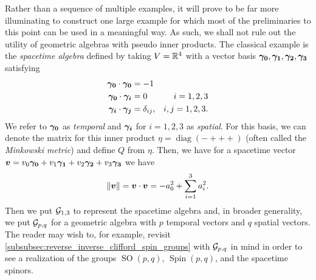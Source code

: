 Rather than a sequence of multiple examples, it will prove to be far more illuminating to construct one large example for which most of the preliminaries to this point can be used in a meaningful way. As such, we shall not rule out the utility of geometric algebras with pseudo inner products. The classical example is the \emph{spacetime algebra} defined by taking $V=\mathbb{R}^4$ with a vector basis $\boldsymbol{\gamma_0},\boldsymbol{\gamma_1},\boldsymbol{\gamma_2},\boldsymbol{\gamma_3}$ satisfying
\begin{subequations}
\begin{align}
\boldsymbol{\gamma_0} \cdot \boldsymbol{\gamma_0} &= -1\\
\boldsymbol{\gamma_0} \cdot \boldsymbol{\gamma_i} &= 0  &i=1,2,3\\
\boldsymbol{\gamma_i} \cdot \boldsymbol{\gamma_j} &= \delta_{ij}, &i,j=1,2,3.
\end{align}
\end{subequations}
We refer to $\boldsymbol{\gamma_0}$ as \emph{temporal} and $\boldsymbol{\gamma_i}$ for $i=1,2,3$ as \emph{spatial}. For this basis, we can denote the matrix for this inner product $\eta =\operatorname{diag}(-+++)$ (often called the \emph{Minkowski metric}) and define $Q$ from $\eta$. Then, we have for a spacetime vector $\boldsymbol{v} = v_0 \boldsymbol{\gamma_0} +v_1 \boldsymbol{\gamma_1} + v_2 \boldsymbol{\gamma_2} + v_3 \boldsymbol{\gamma_3}$ we have
\begin{equation}
\label{eq:spacetime_inner_product}
\|\boldsymbol{v}\| = \boldsymbol{v} \cdot \boldsymbol{v} = -a_0^2 + \sum_{i=1}^3 a_i^2.
\end{equation}
Then we put $\mathcal{G}_{1,3}$ to represent the spacetime algebra and, in broader generality, we put $\mathcal{G}_{p,q}$ for a geometric algebra with $p$ temporal vectors and $q$ spatial vectors. The reader may wish to, for example, revisit \cref{subsubsec:reverse_inverse_clifford_spin_groups} with $\mathcal{G}_{p,q}$ in mind in order to see a realization of the groups $\operatorname{SO}(p,q)$, $\operatorname{Spin}(p,q)$, and the spacetime spinors.

